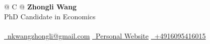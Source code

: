 \documentclass[a4paper,12pt]{article}
\begin{document}



\begin{tabularx}{\linewidth}{@{} C @{}}
\Huge{\textbf{Zhongli Wang}} \\[7.5pt]
PhD Candidate in Economics \\
\\
\href{mailto:nkwangzhongli@gmail.com}{\raisebox{-0.05\height}\faEnvelope \ nkwangzhongli@gmail.com}\; %
\href{https://sites.google.com/view/zhongli-wang/}{\raisebox{-0.05\height}\faGlobe \ Personal Website}\; %
\href{tel:+4916095416015}{\raisebox{-0.05\height}\faMobile \ +4916095416015} \\


\end{tabularx}

\fancyfoot[R]{\small\textcolor{lightgray}{Updated: \today}}

\end{document}
